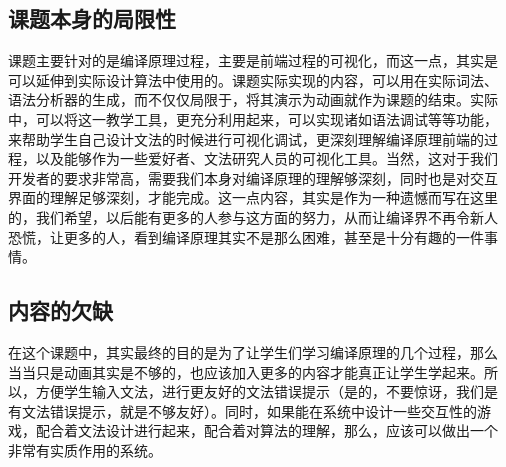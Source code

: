 \subsection{课题本身的局限性}
课题主要针对的是编译原理过程，主要是前端过程的可视化，而这一点，其实是
可以延伸到实际设计算法中使用的。课题实际实现的内容，可以用在实际词法、
语法分析器的生成，而不仅仅局限于，将其演示为动画就作为课题的结束。实际
中，可以将这一教学工具，更充分利用起来，可以实现诸如语法调试等等功能，
来帮助学生自己设计文法的时候进行可视化调试，更深刻理解编译原理前端的过
程，以及能够作为一些爱好者、文法研究人员的可视化工具。当然，这对于我们
开发者的要求非常高，需要我们本身对编译原理的理解够深刻，同时也是对交互
界面的理解足够深刻，才能完成。这一点内容，其实是作为一种遗憾而写在这里
的，我们希望，以后能有更多的人参与这方面的努力，从而让编译界不再令新人
恐慌，让更多的人，看到编译原理其实不是那么困难，甚至是十分有趣的一件事
情。
\subsection{内容的欠缺}
在这个课题中，其实最终的目的是为了让学生们学习编译原理的几个过程，那么
当当只是动画其实是不够的，也应该加入更多的内容才能真正让学生学起来。所
以，方便学生输入文法，进行更友好的文法错误提示（是的，不要惊讶，我们是
有文法错误提示，就是不够友好）。同时，如果能在系统中设计一些交互性的游
戏，配合着文法设计进行起来，配合着对算法的理解，那么，应该可以做出一个
非常有实质作用的系统。
